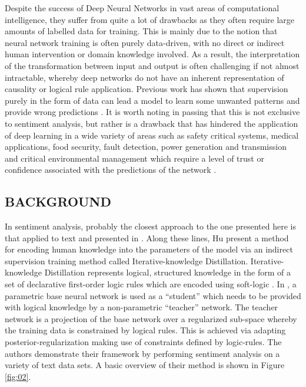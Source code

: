 \documentclass[12pt,a4paper]{article}
\begin{document}
Despite the success of Deep Neural Networks in vast areas of computational intelligence, they suffer from quite a lot of drawbacks as they often require large amounts of labelled data for training. This is mainly due to the notion that neural network training is often purely data-driven, with no direct or indirect human intervention or domain knowledge involved. As a result, the interpretation of the transformation between input and output is often challenging if not almost intractable, whereby deep networks do not have an inherent representation of causality or logical rule application. Previous work has shown that supervision purely in the form of data can lead a model to learn some unwanted patterns and provide wrong predictions \cite{Szegedy:2014}\cite{Nguyen:2015}. It is worth noting in passing that this is not exclusive to sentiment analysis, but rather is a drawback that has hindered the application of deep learning in a wide variety of areas such as safety critical systems, medical applications, food security, fault detection, power generation and transmission and critical environmental management which require a level of trust or confidence associated with the predictions of the network \cite{Ribeiro:2016}.
\vspace{2 mm}

\subsection{BACKGROUND}
In sentiment analysis, probably the closest approach to the one presented here is that applied to text and presented in \cite{Hu:2019}. Along these lines, Hu \cite{Hu:2019} present a method for encoding human knowledge into the parameters of the model via an indirect supervision training method called Iterative-knowledge Distillation. Iterative-knowledge Distillation represents logical, structured knowledge in the form of a set of declarative first-order logic rules which are encoded using soft-logic \cite{Bach:2015}. In \cite{Hu:2019}, a parametric base neural network is used as a ``student'' which needs to be provided with logical knowledge by a non-parametric ``teacher'' network. The teacher network is a projection of the base network over a regularized sub-space whereby the training data is constrained by logical rules. This is achieved via adapting posterior-regularization \cite{Ganchev:2010} making use of constraints defined by logic-rules. The authors demonstrate their framework by performing sentiment analysis on a variety of text data sets. A basic overview of their method is shown in Figure \ref{fig:02}.
\vspace{2 mm}
\end{document}

